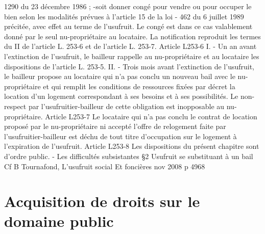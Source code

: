 \documentclass[11pt,a4paper]{report}
\begin{document}
1290 du 23 décembre 1986 ;
-soit donner congé pour vendre ou pour occuper le bien selon les modalités prévues à l'article 15 de la loi -
462 du 6 juillet 1989 précitée, avec effet au terme de l'usufruit. Le congé est dans ce cas valablement donné par
le seul nu-propriétaire au locataire.
La notification reproduit les termes du II de l'article L. 253-6 et de l'article L. 253-7.
Article L253-6
I. - Un an avant l'extinction de l'usufruit, le bailleur rappelle au nu-propriétaire et au locataire les dispositions
de l'article L. 253-5.
II. - Trois mois avant l'extinction de l'usufruit, le bailleur propose au locataire qui n'a pas conclu un nouveau
bail avec le nu-propriétaire et qui remplit les conditions de ressources fixées par décret la location d'un
logement correspondant à ses besoins et à ses possibilités.
Le non-respect par l'usufruitier-bailleur de cette obligation est inopposable au nu-propriétaire.
Article L253-7
Le locataire qui n'a pas conclu le contrat de location proposé par le nu-propriétaire ni accepté l'offre de
relogement faite par l'usufruitier-bailleur est déchu de tout titre d'occupation sur le logement à l'expiration de
l'usufruit.
Article L253-8
Les dispositions du présent chapitre sont d'ordre public.
- Les difficultés subsistantes
§2 Usufruit se substituant à un bail
Cf B Tournafond, L’usufruit social Et foncières nov 2008 p 4968
\part{Acquisition de droits sur le domaine public}
\end{document}
